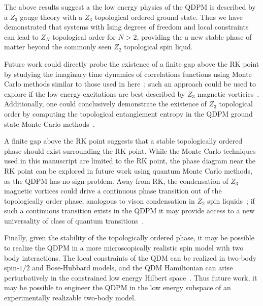 \documentclass[twocolumn,prb,aps,floatfix,superscriptaddress]{revtex4-1}
\begin{document}
The above results suggest a the low energy physics of the QDPM is described by a $Z_3$ gauge theory with a $Z_3$ topological ordered ground state. Thus we have demonstrated that systems with Ising degrees of freedom and local constraints can lead to $Z_N$ topological order for $N>2$, providing the a new stable phase of matter beyond the commonly seen $Z_2$ topological spin liqud.

Future work could directly probe the existence of a finite gap above the RK point by studying the imaginary time dynamics of correlations functions using Monte Carlo methods similar to those used in here~\cite{Henley1997,Henley2004a}; such an approach could be used to explore if the low energy excitations are best described by $Z_3$ magnetic vorticies~\cite{Ivanov2004,Ralko2007,Misguich2008d}. Additionally, one could conclusively demonstrate the existence of $Z_3$ topological order by computing the topological entanglement entropy in the QDPM ground state Monte Carlo methods~\cite{Levin2005a,Kitaev2006b,Hastings2010}. 

A finite gap above the RK point suggests that a stable topologically ordered phase should exist surrounding the RK point. While the Monte Carlo techniques used in this manuscript are limited to the RK point, the phase diagram near the RK point can be explored in future work using quantum Monte Carlo methods, as the QDPM has no sign problem. Away from RK, the condensation of $Z_3$ magnetic vortices could drive a continuous phase transition out of the topologically order phase, analogous to vison condensation in $Z_2$ spin liquids~\cite{Jalabert1991,Ralko2007,Huh2011,Hao2014,Slagle2014}; if such a continuous transition exists in the QDPM it may provide access to a new universality of class of quantum transitions~\cite{XU2012}.

Finally, given the stability of the topologically ordered phase, it may be possible to realize the QDPM in a more microscopically realistic spin model with two body interactions. The local constraints of the QDM can be realized in two-body spin-$1/2$ and Bose-Hubbard models, and the QDM Hamiltonian can arise perturbatively in the constrained low energy Hilbert space~\cite{Balents2002a,Zhitomirsky2005,Isakov2006c,Albuquerque2008}. Thus future work, it may be possible to engineer the QDPM in the low energy subspace of an experimentally realizable two-body model.

\end{document}
